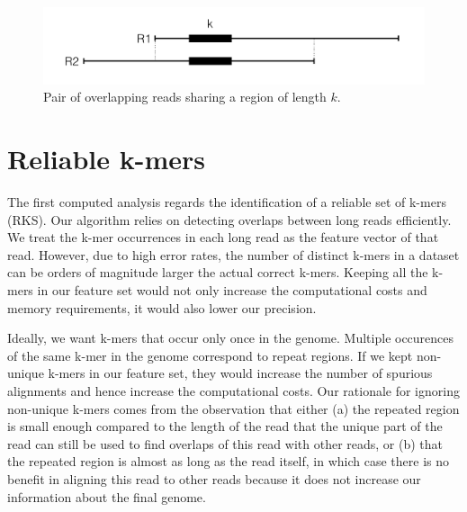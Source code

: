 \documentclass[11pt]{article}
\begin{document}
\begin{figure}
    \centering
    \includegraphics[width=\textwidth]{image/overview.png}
    \caption{Pair of overlapping reads sharing a region of length $k$.}
    \label{fig:overview}
\end{figure}

\section{Reliable k-mers}\label{rks}

The first computed analysis regards the identification of a reliable set of k-mers (RKS). 
Our algorithm relies on detecting overlaps between long reads efficiently.
We treat the k-mer occurrences in each long read as the feature vector of that read. 
However, due to high error rates, the number of distinct k-mers in a dataset can be orders of magnitude larger the actual correct k-mers. 
Keeping all the k-mers in our feature set would not only increase the computational costs and memory requirements, it would also lower our precision.

Ideally, we want k-mers that occur only once in the genome. 
Multiple occurences of the same k-mer in the genome correspond to repeat regions. 
If we kept non-unique k-mers in our feature set, they would increase the number of spurious alignments and hence increase the computational costs. 
Our rationale for ignoring non-unique k-mers comes from the observation that either (a) the repeated region is small enough compared to the length of the read that the unique part of the read can still be used to find overlaps of this read with other reads, or (b) that the repeated region is almost as long as the read itself, in which case there is no benefit in aligning this read to other reads because it does not increase our information about the final genome. 
\end{document}

